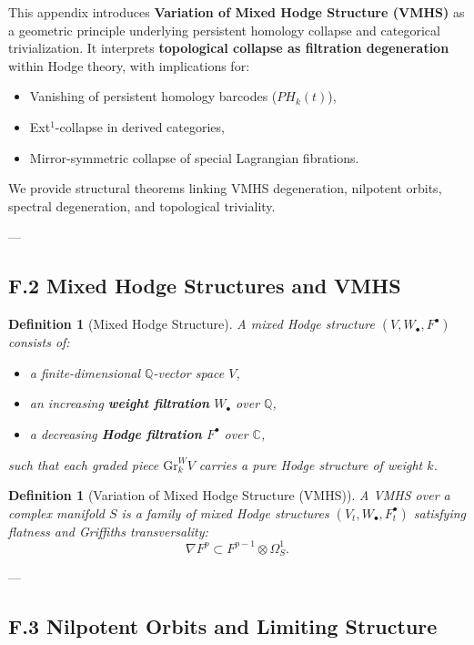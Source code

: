 \documentclass[11pt]{article}
\newtheorem{definition}[theorem]{Definition}
\begin{document}
This appendix introduces \textbf{Variation of Mixed Hodge Structure (VMHS)} as a geometric principle  
underlying persistent homology collapse and categorical trivialization.  
It interprets \textbf{topological collapse as filtration degeneration} within Hodge theory, with implications for:

\begin{itemize}
  \item Vanishing of persistent homology barcodes ($PH_k(t)$),
  \item Ext$^1$-collapse in derived categories,
  \item Mirror-symmetric collapse of special Lagrangian fibrations.
\end{itemize}

We provide structural theorems linking VMHS degeneration, nilpotent orbits, spectral degeneration, and topological triviality.

---

\subsection*{F.2 Mixed Hodge Structures and VMHS}

\begin{definition}[Mixed Hodge Structure]
A \emph{mixed Hodge structure} $(V, W_\bullet, F^\bullet)$ consists of:
\begin{itemize}
  \item a finite-dimensional $\mathbb{Q}$-vector space $V$,
  \item an increasing \textbf{weight filtration} $W_\bullet$ over $\mathbb{Q}$,
  \item a decreasing \textbf{Hodge filtration} $F^\bullet$ over $\mathbb{C}$,
\end{itemize}
such that each graded piece $\mathrm{Gr}_k^W V$ carries a pure Hodge structure of weight $k$.
\end{definition}

\begin{definition}[Variation of Mixed Hodge Structure (VMHS)]
A \emph{VMHS} over a complex manifold $S$ is a family of mixed Hodge structures $(V_t, W_\bullet, F_t^\bullet)$  
satisfying flatness and Griffiths transversality:
\[
\nabla F^p \subset F^{p-1} \otimes \Omega_S^1.
\]
\end{definition}

---

\subsection*{F.3 Nilpotent Orbits and Limiting Structure}
\end{document}
